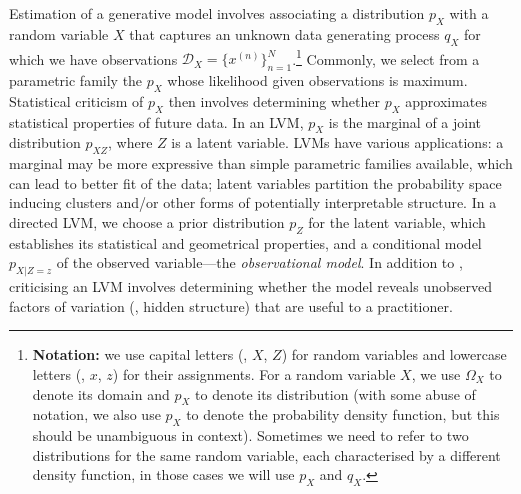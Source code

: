 Estimation of a generative model involves associating a distribution $p_X$ with a random variable $X$ that captures an unknown data generating process $q_X$ for which we have observations $\mathcal D_X = \{x^{(n)}\}_{n=1}^N$.\footnote{\textbf{Notation:} we use capital letters (\eg, $X$, $Z$) for random variables and lowercase letters (\eg, $x$, $z$) for their assignments. For a random variable $X$, we use $\Omega_X$ to denote its domain and $p_X$ to denote its distribution (with some abuse of notation, we also use $p_X$ to denote the probability density function, but this should be unambiguous in context). Sometimes we need to refer to two distributions for the same random variable, each characterised by a different density function, in those cases we will use $p_X$ and $q_X$.} 
Commonly, we select from a parametric family the $p_X$ whose likelihood given observations is maximum. %
Statistical criticism of $p_X$ then involves determining whether \enumone $p_X$ approximates statistical properties of future data. 
In an LVM, $p_X$ is the marginal of a joint distribution $p_{XZ}$, where $Z$ is a latent variable. LVMs have various applications: a marginal  may be more expressive than simple parametric families available, %
which can lead to better fit of the data;
latent variables partition the probability space inducing clusters and/or other forms of potentially interpretable structure.
In a directed LVM, we choose a prior distribution $p_Z$ for the latent variable, which establishes its statistical and geometrical properties, and a conditional model $p_{X|Z=z}$ of the observed variable---the \emph{observational model}. %
In addition to \enumone, criticising an LVM involves determining whether \enumtwo the model reveals unobserved factors of variation (\ie, hidden structure) that are useful to a practitioner.  
